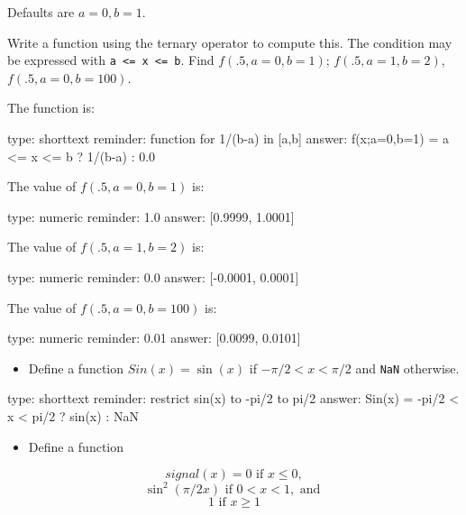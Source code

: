 \documentclass[12pt]{article}
\begin{document}
Defaults are $a=0, b=1$.

Write a function using the ternary operator to compute this. The
condition may be expressed with
\texttt{a \textless{}= x \textless{}= b}. Find $f(.5, a=0, b=1)$;
$f(.5, a=1, b=2)$, $f(.5,a=0, b=100)$.

The function is:

\begin{answer}
type: shorttext
reminder: function for 1/(b-a) in [a,b]
answer: f(x;a=0,b=1) = a <= x <= b ? 1/(b-a) : 0.0

\end{answer}

The value of $f(.5, a=0, b=1)$ is:

\begin{answer}
    type: numeric
    reminder: 1.0
    answer: [0.9999, 1.0001]

\end{answer}

The value of $f(.5, a=1, b=2)$ is:

\begin{answer}
    type: numeric
    reminder: 0.0
    answer: [-0.0001, 0.0001]

\end{answer}

The value of $f(.5,a=0, b=100)$ is:

\begin{answer}
    type: numeric
    reminder: 0.01
    answer: [0.0099, 0.0101]

\end{answer}

\begin{itemize}
\itemsep1pt\parskip0pt
\item
  Define a function $Sin(x) = \sin(x)$ if $-\pi/2 < x < \pi/2$ and
  \texttt{NaN} otherwise.
\end{itemize}

\begin{answer}
type: shorttext
reminder: restrict sin(x) to -pi/2 to pi/2
answer: Sin(x) = -pi/2 < x < pi/2 ? sin(x) : NaN

\end{answer}

\begin{itemize}
\itemsep1pt\parskip0pt
\item
  Define a function
\end{itemize}

\[
signal(x) = 0 \text{ if } x\leq 0,
\] \[
\sin^2(\pi /2 x) \text{ if } 0<x<1, \text{ and }
\] \[
1 \text{ if } x\geq 1 
\]
\end{document}
